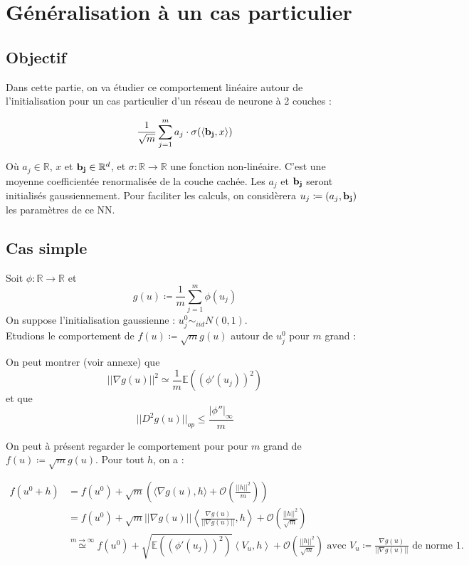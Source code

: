 \documentclass[a4paper, 11pt, french]{article}
\theoremstyle{definition}
\begin{document}
\newpage

	\section{Généralisation à un cas particulier}
	
	\subsection{Objectif}
	
	Dans cette partie, on va étudier ce comportement linéaire autour de l'initialisation pour un cas particulier d'un réseau de neurone à 2 couches :
	
	\[ \frac{1}{\sqrt{m}} \sum_{j=1}^{m} a_j \cdot \sigma (\langle {\bf b_j}, x \rangle) \]
	
	Où $a_j \in \mathbb{R}$, $x$ et ${\bf b_j} \in \mathbb{R}^d$, et $\sigma : \mathbb{R} \to \mathbb{R}$ une fonction non-linéaire. C'est une moyenne coefficientée renormalisée de la couche cachée. Les $a_j$ et ${\bf b_j}$ seront initialisés gaussiennement. Pour faciliter les calculs, on considèrera $u_j \coloneqq (a_j, {\bf b_j})$ les paramètres de ce NN.
	
	\subsection{Cas simple}
	
	Soit $\phi : \mathbb{R} \to \mathbb{R}$ et \[g(u) \coloneqq \frac{1}{m} \sum_{j=1}^{m} \phi(u_j)\] On suppose l'initialisation gaussienne : $u_j^0 \sim_{iid} N(0,1)$. \\
	
	Etudions le comportement de $f(u) \coloneqq \sqrt{m} g(u)$ autour de $u_j^0$ pour $m$ grand :
	
	On peut montrer (voir annexe) que \[||\nabla g(u) ||^2 \simeq \frac{1}{m} \mathbb{E}((\phi '(u_j))^2)\] et que \[||D^2 g(u)||_{op} \leq \frac{|\phi ''|_{\infty}}{m}\]
	
	On peut à présent regarder le comportement pour pour $m$ grand de $f(u) \coloneqq \sqrt m g(u)$. Pour tout $h$, on a :
	
	\begin{align*}
		f(u^0 + h) &= f(u^0) + \sqrt m \left(\langle \nabla g(u), h \rangle + \mathcal{O}\left(\frac{||h||^2}{m}\right) \right) \\
		&= f(u^0) + \sqrt m ||\nabla g(u)|| \left \langle \frac{\nabla g(u)}{||\nabla g(u)||}, h \right \rangle  + \mathcal{O}\left(\frac{||h||^2}{\sqrt m}\right) \\
		&\stackrel{m \to \infty}{\simeq} f(u^0) + \sqrt{\mathbb{E}((\phi '(u_j))^2)} \left \langle V_u, h \right \rangle  + \mathcal{O}\left(\frac{||h||^2}{\sqrt m}\right) \text{ avec $V_u \coloneqq \frac{\nabla g(u)}{||\nabla g(u)||}$ de norme 1.}
	\end{align*}
	
\end{document}
